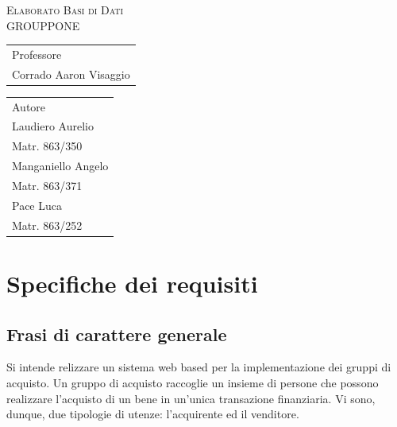 \documentclass[a4paper, 10pt]{report}
\begin{document}
\begin{center}
\end{center}
\bigskip
\vspace{1cm}
\begin{center}
\textsc{Elaborato Basi di Dati\\
GROUPPONE}
\end{center}
\bigskip
\vspace{6cm}
\begin {tabular}[t]{l}
Professore\\
Corrado Aaron Visaggio
\end{tabular}
\hfill
\begin{tabular}[t]{l}
                 Autore\\
Laudiero Aurelio\\
Matr. 863/350\\
Manganiello Angelo\\
Matr. 863/371\\
Pace Luca\\
Matr. 863/252\\
\end{tabular}
\thispagestyle{empty}
\tableofcontents
\thispagestyle{empty}
\setcounter{page}{0}

\chapter{Specifiche dei requisiti}

\section{Frasi di carattere generale}
Si intende relizzare un sistema web based per la implementazione dei gruppi di acquisto. Un gruppo di acquisto raccoglie un insieme di persone che possono realizzare l'acquisto di un bene in un'unica transazione finanziaria. 
Vi sono, dunque, due tipologie di utenze: l'acquirente ed il venditore. 
\end{document}
